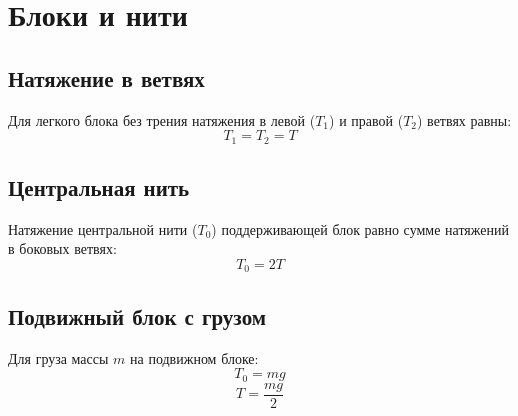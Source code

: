 \documentclass{article}
\begin{document}
\section*{Блоки и нити}

\subsection*{Натяжение в ветвях}
Для легкого блока без трения натяжения в левой ($T_1$) и правой ($T_2$) ветвях равны:
\[T_1 = T_2 = T\]

\subsection*{Центральная нить}
Натяжение центральной нити ($T_0$) поддерживающей блок равно сумме натяжений в боковых ветвях:
\[T_0 = 2T\]

\subsection*{Подвижный блок с грузом}
Для груза массы $m$ на подвижном блоке:
\[T_0 = mg\]
\[T = \frac{mg}{2}\]
\end{document}
